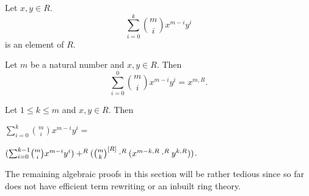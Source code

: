 \documentclass[english,11pt]{article}
\begin{document}
\newcommand{\binsum}[5]{{\sum}_{i = 0}^{{#1}} {#2 \choose i} #3^{#2 - i} #4^{i}}

\begin{forthel}

\begin{signature} Let $x,y \in R$.
\[\binsum{k}{m}{x}{y}{R}\] is an element of $R$.
\end{signature}

\begin{axiom} Let $m$ be a natural number and $x,y \in R$.
Then 
\[\binsum{0}{m}{x}{y}{R} = x^{m,R}.\]
\end{axiom}

\begin{axiom}[id = Summation recursion, title = Summation recursion]
Let $1 \leq k \leq m$ and $x,y \in R$. 
Then 

$\binsum{k}{m}{x}{y}{R} = $

$(\binsum{k-1}{m}{x}{y}{R}) +^{R} 
(\cho{m}{k}^{[R]} \cdot^{R} (x^{m - k,R} \cdot^{R} y^{k,R}))$. 
\end{axiom}
\end{forthel}
The remaining algebraic proofs in this section will be rather tedious since 
\Naproche so far does not have efficient term rewriting or an inbuilt ring theory.
\end{document}
